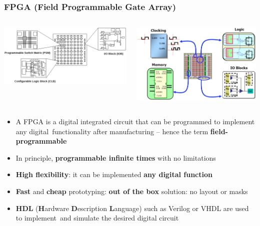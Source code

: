 \documentclass[aspectratio=169]{beamer}
\begin{document}
		\begin{frame}
	\frametitle{FPGA  (\textbf{F}ield \textbf{P}rogrammable \textbf{G}ate \textbf{A}rray)}
	\begin{columns}
		\begin{center}
			\includegraphics[width=0.7 \textwidth]{IMG/FPGA_PARTS}
		\end{center}
		\begin{center}
			\includegraphics[width=0.6 \textwidth]{IMG/FPGA2}
		\end{center}
	\end{columns}
		\vspace{2mm}
		\begin{itemize}
			\item A FPGA is a digital integrated circuit that can be programmed to implement any digital~functionality after manufacturing – hence the term \textbf{field-programmable}
			\item In principle, \textbf{programmable infinite times} with no limitations
			\item \textbf{High flexibility}: it can be implemented \textbf{any digital function}
			\item \textbf{Fast} and \textbf{cheap} prototyping: \textbf{out of the box} solution: no layout or masks
			\item \textbf{HDL} (\textbf{H}ardware \textbf{D}escription \textbf{L}anguage) such as Verilog or VHDL are used to implement~and simulate the desired digital circuit
		\end{itemize}
	\end{frame}
\end{document}
